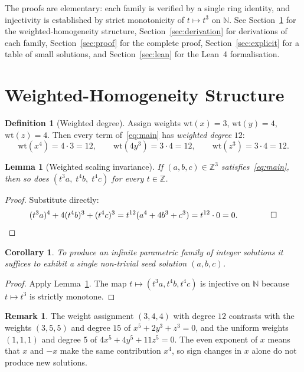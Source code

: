 \documentclass[12pt,a4paper]{article}
\newtheorem{lemma}[theorem]{Lemma}
\newtheorem{corollary}[theorem]{Corollary}
\theoremstyle{definition}
\newtheorem{definition}[theorem]{Definition}
\newtheorem{remark}[theorem]{Remark}
\newcommand{\Z}{\mathbb{Z}}
\newcommand{\N}{\mathbb{N}}
\begin{document}
The proofs are elementary: each family is verified by a single ring identity,
and injectivity is established by strict monotonicity of $t \mapsto t^3$ on $\N$.
See Section~\ref{sec:structure} for the weighted-homogeneity structure,
Section~\ref{sec:derivation} for derivations of each family,
Section~\ref{sec:proof} for the complete proof,
Section~\ref{sec:explicit} for a table of small solutions,
and Section~\ref{sec:lean} for the Lean~4 formalisation.

\section{Weighted-Homogeneity Structure}\label{sec:structure}

\begin{definition}[Weighted degree]
  Assign weights $\mathrm{wt}(x) = 3$, $\mathrm{wt}(y) = 4$, $\mathrm{wt}(z) = 4$.
  Then every term of~\eqref{eq:main} has \emph{weighted degree} $12$:
  \[
    \mathrm{wt}(x^4) = 4 \cdot 3 = 12, \qquad
    \mathrm{wt}(4y^3) = 3 \cdot 4 = 12, \qquad
    \mathrm{wt}(z^3) = 3 \cdot 4 = 12.
  \]
\end{definition}

\begin{lemma}[Weighted scaling invariance]\label{lem:scale}
  If $(a, b, c) \in \Z^3$ satisfies~\eqref{eq:main}, then so does
  $(t^3 a,\; t^4 b,\; t^4 c)$ for every $t \in \Z$.
\end{lemma}

\begin{proof}
  Substitute directly:
  \[
    (t^3 a)^4 + 4(t^4 b)^3 + (t^4 c)^3
    = t^{12}(a^4 + 4b^3 + c^3) = t^{12} \cdot 0 = 0. \qquad\qed
  \]
\end{proof}

\begin{corollary}
  To produce an infinite parametric family of integer solutions it suffices to
  exhibit a single non-trivial \emph{seed} solution $(a, b, c)$.
\end{corollary}

\begin{proof}
  Apply Lemma~\ref{lem:scale}.  The map $t \mapsto (t^3 a, t^4 b, t^4 c)$ is
  injective on $\N$ because $t \mapsto t^3$ is strictly monotone.
\end{proof}

\begin{remark}
  The weight assignment $(3, 4, 4)$ with degree $12$ contrasts with the weights
  $(3, 5, 5)$ and degree $15$ of $x^5 + 2y^3 + z^3 = 0$, and the uniform weights
  $(1,1,1)$ and degree $5$ of $4x^5 + 4y^5 + 11z^5 = 0$.  The even exponent of $x$
  means that $x$ and $-x$ make the same contribution $x^4$, so sign changes in $x$
  alone do not produce new solutions.
\end{remark}
\end{document}
